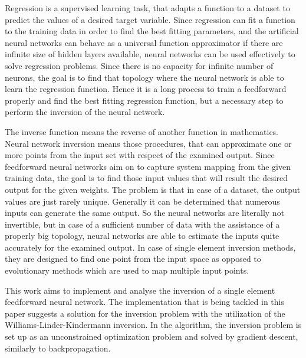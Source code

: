 Regression is a supervised learning task, that adapts a function to a dataset to predict the values of a desired target variable. Since regression can fit a function to the training data in order to find the best fitting parameters, and the artificial neural networks can behave as a universal function approximator if there are infinite size of hidden layers available, neural networks can be used effectively to solve regression problems. Since there is no capacity for infinite number of neurons, the goal is to find that topology where the neural network is able to learn the regression function. Hence it is a long process to train a feedforward properly and find the best fitting regression function, but a necessary step to perform the inversion of the neural network. \medskip

The inverse function means the reverse of another function in mathematics. Neural network inversion means those procedures, that can approximate one or more points from the input set with respect of the examined output. Since feedforward neural networks aim on to capture system mapping from the given training data, the goal is to find those input values that will result the desired output for the given weights. The problem is that in case of a dataset, the output values are just rarely unique. Generally it can be determined that numerous inputs can generate the same output. So the neural networks are literally not invertible, but in case of a sufficient number of data with the assistance of a properly big topology, neural networks are able to estimate the inputs quite accurately for the examined output. In case of single element inversion methods, they are designed to find one point from the input space as opposed to evolutionary methods which are used to map multiple input points. \medskip

This work aims to implement and analyse the inversion of a single element feedforward neural network. The implementation that is being tackled in this paper suggests a solution for the inversion problem with the utilization of the Williams-Linder-Kindermann inversion. In the algorithm, the inversion problem is set up as an unconstrained optimization problem and solved by gradient descent, similarly to backpropagation.

